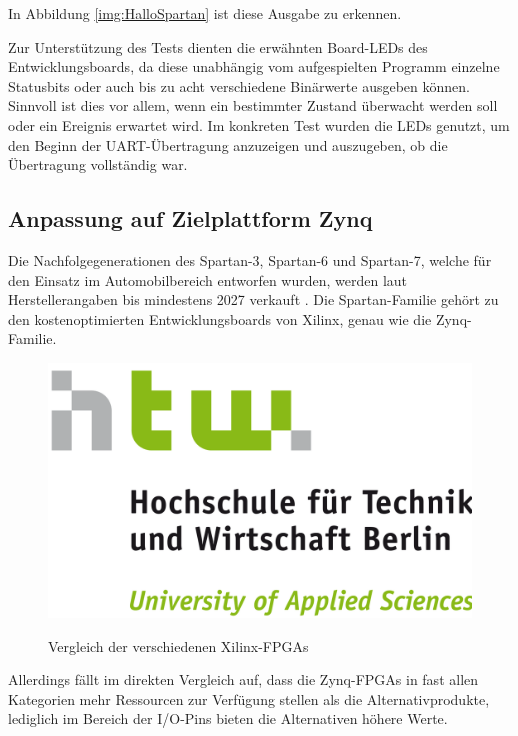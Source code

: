 \documentclass[11pt,a4paper,titlepage]{article}
\begin{document}
In Abbildung \ref{img:HalloSpartan} ist diese Ausgabe zu erkennen. 

Zur Unterstützung des Tests dienten die erwähnten Board-LEDs des Entwicklungsboards, da diese unabhängig vom aufgespielten Programm einzelne Statusbits oder auch bis zu acht verschiedene Binärwerte ausgeben können. Sinnvoll ist dies vor allem, wenn ein bestimmter Zustand überwacht werden soll oder ein Ereignis erwartet wird. Im konkreten Test wurden die LEDs genutzt, um den Beginn der UART-Übertragung anzuzeigen und auszugeben, ob die Übertragung vollständig war.

\subsection{Anpassung auf Zielplattform Zynq}

Die Nachfolgegenerationen des Spartan-3, Spartan-6 und Spartan-7, welche für den Einsatz im Automobilbereich entworfen wurden, werden laut Herstellerangaben bis mindestens 2027 verkauft \cite{spartan6}. Die Spartan-Familie gehört zu den kostenoptimierten Entwicklungsboards von Xilinx, genau wie die Zynq-Familie.

\begin{figure}[!ht]
\centering
\includegraphics[width=\textwidth]{images/htw_hochschule.png}
\label{img:VergleichSpartanZynq}
\caption{Vergleich der verschiedenen Xilinx-FPGAs \cite{VergleichSpartanZynq}}
\end{figure}

Allerdings fällt im direkten Vergleich auf, dass die Zynq-FPGAs in fast allen Kategorien mehr Ressourcen zur Verfügung stellen als die Alternativprodukte, lediglich im Bereich der I/O-Pins bieten die Alternativen höhere Werte.\\
\end{document}

